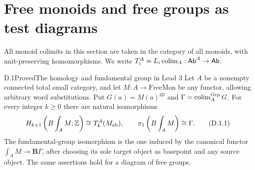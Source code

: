 \section{Free monoids and free groups as test diagrams}
\label{sec:D}

All monoid colimits in this section are taken in the category of all
monoids, with unit-preserving homomorphisms. We write
$T_i^A=L_i\operatorname*{colim}_A:\mathsf{Ab}^A\to\mathsf{Ab}$.

\begin{claim}{D.1}{Proved}{The homology and fundamental group in Lead 3}
\label{D:homology}
Let $A$ be a nonempty connected total small category, and let
$M:A\to\mathrm{FreeMon}$ be any functor, allowing arbitrary word
substitutions. Put $G(a)=M(a)^{\mathrm{gp}}$ and
$\Gamma=\operatorname*{colim}_A^{\mathrm{Grp}}G$. For every integer $k\geq0$
there are natural isomorphisms
\[
 H_{k+1}\left(B\int_A M;\mathbb Z\right)\cong T_k^A(M_{\mathrm{ab}}),
 \qquad \pi_1\left(B\int_A M\right)\cong\Gamma.
 \tag{D.1.1}
\]
The fundamental-group isomorphism is the one induced by the
canonical functor $\int_A M\to\mathbf B\Gamma$, after choosing
its sole target object as basepoint and any source object. The
same assertions hold for a diagram of free groups.
\end{claim}
